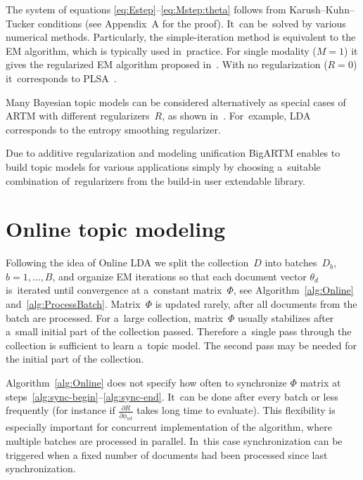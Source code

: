 \documentclass[russian]{llncs}
\begin{document}
The system of equations \eqref{eq:Estep}--\eqref{eq:Mstep:theta}
follows from Karush--Kuhn--Tucker conditions (see Appendix~A for the proof).
It~can be~solved by various numerical methods.
Particularly,
the simple-iteration method is equivalent to the EM algorithm,
which is typically used in~practice.
For single modality (${M=1}$) it gives the regularized EM algorithm
proposed in~\cite{voron14dan-eng}.
With no regularization (${R=0}$) it~corresponds to PLSA~\cite{hofmann99plsi}.

Many Bayesian topic models can be considered alternatively
as special cases of ARTM with different regularizers~$R$,
as shown in~\cite{voron14aist,voron14mlj}.
For~example,
LDA~\cite{blei03latent} corresponds to the entropy smoothing regularizer.

Due to additive regularization and modeling unification
BigARTM enables to build topic models for various applications
simply by choosing a~suitable combination of~regularizers
from the build-in user extendable library.

\section{Online topic modeling}
\label{sec:Online}

Following the idea of Online LDA \cite{hoffman10online}
we split the collection~$D$ into batches~$D_b$, ${b=1,\dots,B}$,
and organize EM iterations so that
each document vector $\theta_d$ is~iterated until convergence at a~constant matrix~$\Phi$,
see Algorithm~\ref{alg:Online} and~\ref{alg:ProcessBatch}.
Matrix~$\Phi$ is updated rarely, after all documents from the batch are processed.
For a~large collection,
matrix~$\Phi$ usually stabilizes after a~small initial part of the collection passed.
Therefore a~single pass through the collection is sufficient to learn a~topic model.
The second pass may be needed for the initial part of the collection.

Algorithm~\ref{alg:Online} does not specify how often to synchronize $\Phi$ matrix
at steps~\ref{alg:sync-begin}--\ref{alg:sync-end}.
It~can be done after every batch or less frequently
(for instance if $\frac{\partial R}{\partial \phi_{wt}}$ takes long time to evaluate).
This flexibility is especially important for concurrent implementation of the algorithm,
where multiple batches are processed in parallel.
In~this case synchronization can be triggered when a fixed number of documents had been processed since last synchronization.
\end{document}
